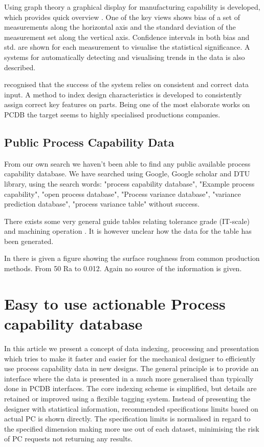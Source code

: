 \documentclass[aip,amsmath, preprint, author-year]{revtex4-1}
\begin{document}
Using graph theory a graphical display for manufacturing capability is developed, which provides quick overview \citep{thornton2000use}. 
One of the key views shows bias of a set of measurements along the horizontal axis and the standard deviation of the measurement set along the vertical axis. 
Confidence intervals in both bias and std. are shown for each measurement to visualise the statistical significance. 
A systems for automatically detecting and visualising trends in the data is also described.

\cite{kern2003forecasting} recognised that the success of the system relies on consistent and correct data input. 
A method to index design characteristics is developed to consistently assign correct key features on parts. 
Being one of the most elaborate works on PCDB the target seems to highly specialised productions companies. 


\subsection{Public Process Capability Data}
From our own search we haven't been able to find any public available process capability database. 
We have searched using Google, Google scholar and DTU library, using the search words: "process capability database", "Example process capability", "open process database", "Process variance database", "variance prediction database", "process variance table" without success. 

There exists some very general guide tables relating tolerance grade (IT-scale) and machining operation \citep{united1967preferred, american1978preferred}. 
It is however unclear how the data for the table has been generated.

In \cite[p. 715]{oberg2008machinery} there is given a figure showing the surface roughness from common production methods. From 50 Ra to 0.012. 
Again no source of the information is given. \\[1cm]

\section{Easy to use actionable Process capability database }
In this article we present a concept of data indexing, processing and presentation which tries to make it faster and easier for the mechanical designer to efficiently use process capability data in new designs. 
The general principle is to provide an interface where the data is presented in a much more generalised than typically done in PCDB interfaces. 
The core indexing scheme is simplified, but details are retained or improved using a flexible tagging system. 
Instead of presenting the designer with statistical information, recommended specifications limits based on actual PC is shown directly. 
The specification limits is normalised in regard to the specified dimension making more use out of each dataset, minimising the risk of PC requests not returning any results. 
\end{document}

